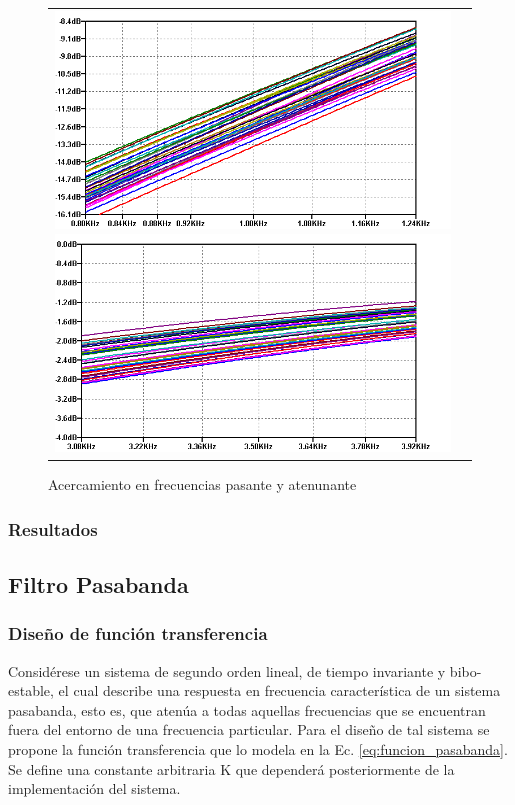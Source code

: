 \begin{figure}[H]
    \centering
    \begin{tabular}{c c}
        \includegraphics[scale=0.4]{../EJ2/Recursos/hp_montecarlo_fa.png}
        \includegraphics[scale=0.4]{../EJ2/Recursos/hp_montecarlo_fp.png}
    \end{tabular}
    \caption{Acercamiento en frecuencias pasante y atenunante}
    \label{fig:hp_montecarlo_frecuencias}
\end{figure}

\subsubsection{Resultados}

\subsection{Filtro Pasabanda}
\subsubsection{Dise\~no de funci\'on transferencia}
Consid\'erese un sistema de segundo orden lineal, de tiempo invariante y bibo-estable, el cual describe una respuesta en frecuencia caracter\'istica de un sistema pasabanda, esto es,
que aten\'ua a todas aquellas frecuencias que se encuentran fuera del entorno de una frecuencia particular. Para el dise\~no de tal sistema se propone la funci\'on transferencia que lo modela
en la Ec. \ref{eq:funcion_pasabanda}. Se define una constante arbitraria K que depender\'a posteriormente de la implementaci\'on del sistema.

